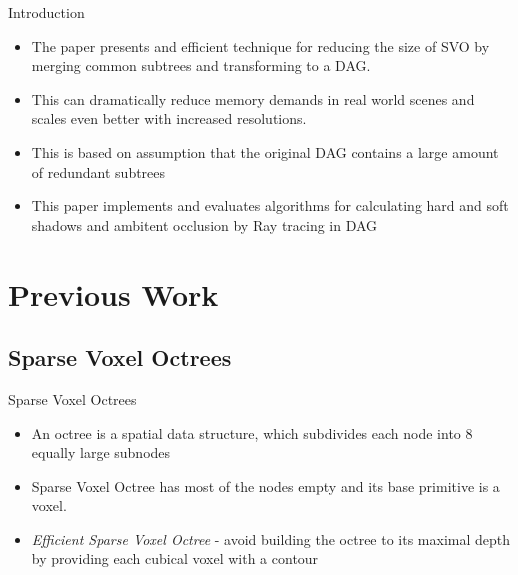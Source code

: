 \documentclass{beamer}
\begin{document}
\begin{frame}{Introduction}
  \begin{itemize}
  \item {
  		The paper presents and efficient technique for reducing the size of SVO by merging common subtrees and transforming to a DAG.
    }
    \item{
    	This can dramatically reduce memory demands in real world scenes and scales even better with increased resolutions.
    }
    \item{
    	This is based on assumption that the original DAG contains a large amount of redundant subtrees
    }
    \item{
    	This paper implements and evaluates algorithms for calculating hard and soft shadows and ambitent occlusion by Ray tracing in DAG 
    }
 
  \end{itemize}
 
\end{frame}

\section{Previous Work}
\subsection{Sparse Voxel Octrees}
\begin{frame}{Sparse Voxel Octrees}
\begin{itemize}
	\item An octree is a spatial data structure, which subdivides each node into 8 equally large subnodes
	\item Sparse Voxel Octree has most of the nodes empty and its base primitive is a voxel.
	\item \textit{Efficient Sparse Voxel Octree} - avoid building
the octree to its maximal depth by providing each cubical voxel with
a contour
\end{itemize}
\end{frame}
\end{document}
